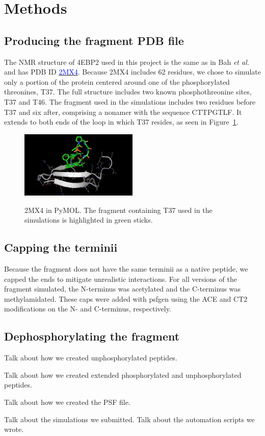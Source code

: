 \section{Methods} %
\label{sec:methods}

\subsection{Producing the fragment PDB file}
The NMR structure of 4EBP2 used in this project is the same as in Bah \textit{et al.}
and has PDB ID \href{http://www.rcsb.org/pdb/explore/explore.do?structureId=2MX4}{\textcolor{blue}{2MX4}}.
Because 2MX4 includes 62 residues, we chose to simulate only a portion of the protein centered around one of the phosphorylated threonines, T37.
The full structure includes two known phosphothreonine sites, T37 and T46.
The fragment used in the simulations includes two residues before T37 and six after, comprising a nonamer with the sequence CTTPGTLF.
It extends to both ends of the loop in which T37 resides, as seen in Figure~\ref{fig:2MX4}.

\begin{figure}[h!]
  \caption{2MX4 in PyMOL. The fragment containing T37 used in the simulations is highlighted in green sticks.}
  \centering
    \includegraphics[width=0.5\textwidth]{2MX4}
  \label{fig:2MX4}
\end{figure}

\subsection{Capping the terminii}
Because the fragment does not have the same terminii as a native peptide, we capped the ends to mitigate unrealistic interactions.
For all versions of the fragment simulated, the N-terminus was acetylated and the C-terminus was methylamidated.
These caps were added with psfgen using the ACE and CT2 modifications on the N- and C-terminus, respectively.

\subsection{Dephosphorylating the fragment}
Talk about how we created unphosphorylated peptides.

Talk about how we created extended phosphorylated and unphosphorylated peptides.

Talk about how we created the PSF file.

Talk about the simulations we submitted. Talk about the automation scripts we wrote.

